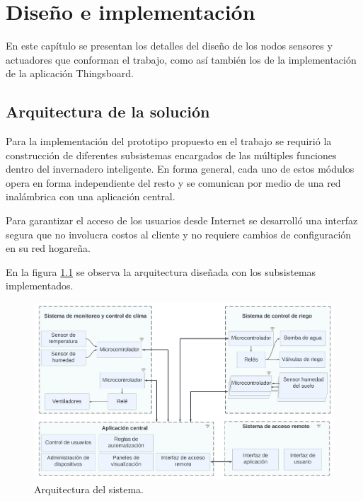 

\chapter{Diseño e implementación} %

\label{Chapter3} %



En este capítulo se presentan los detalles del diseño de los nodos sensores y actuadores que conforman el trabajo, como así también los de la implementación de la aplicación Thingsboard.

\section{Arquitectura de la solución}
\label{sec:Arquitectura de la solución}


Para la implementación del prototipo propuesto en el trabajo se requirió la construcción de diferentes subsistemas encargados de las múltiples funciones dentro del invernadero inteligente. En forma general, cada uno de estos módulos opera en forma independiente del resto y se comunican por medio de una red inalámbrica con una aplicación central. 

Para garantizar el acceso de los usuarios desde Internet se desarrolló una interfaz segura que no involucra costos al cliente y no requiere cambios de configuración en su red hogareña.

En la figura \ref{fig:blockdiagram} se observa la arquitectura diseñada con los subsistemas implementados.


\begin{figure}[h]
	\centering
	\includegraphics[width=1.0\textwidth]{./Figures/blockdiagram4.jpg}
	\caption[Arquitectura del sistema.]{Arquitectura del sistema.}
	\label{fig:blockdiagram}

\end{figure}

